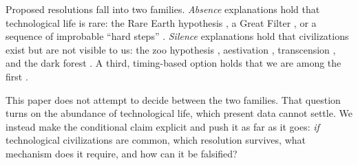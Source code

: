 \documentclass[preprint,12pt]{elsarticle}
\theoremstyle{definition}
\begin{document}
Proposed resolutions fall into two families. \emph{Absence} explanations hold that technological life is rare: the Rare Earth hypothesis \citep{WardBrownlee2000}, a Great Filter \citep{Hanson1998}, or a sequence of improbable ``hard steps'' \citep{Carter1983,SnyderBeattie2021}. \emph{Silence} explanations hold that civilizations exist but are not visible to us: the zoo hypothesis \citep{Ball1973}, aestivation \citep{Sandberg2017}, transcension \citep{Smart2012}, and the dark forest \citep{Liu2008,Yu2015}. A third, timing-based option holds that we are among the first \citep{Lineweaver2001,Hanson2021}.

This paper does not attempt to decide between the two families. That question turns on the abundance of technological life, which present data cannot settle. We instead make the conditional claim explicit and push it as far as it goes: \emph{if} technological civilizations are common, which resolution survives, what mechanism does it require, and how can it be falsified?
\end{document}
